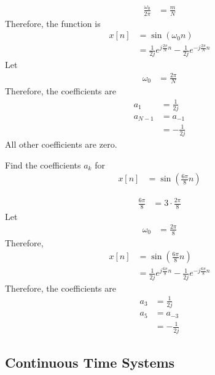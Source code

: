 \documentclass[titlepage, fleqn, a4paper, 12pt, twoside]{article}
\theoremstyle{definition}
\theoremstyle{theorem}
\begin{document}
\begin{solution}
	\begin{align*}
		\frac{\omega_0}{2 \pi} &= \frac{m}{N}
	\end{align*}
	Therefore, the function is
	\begin{align*}
		x[n] &= \sin(\omega_0 n)\\
		&= \frac{1}{2 j} e^{j \frac{2 \pi}{N} n} - \frac{1}{2 j} e^{-j \frac{2 \pi}{N} n}
	\end{align*}
	Let
	\begin{align*}
		\omega_0 &= \frac{2 \pi}{N}
	\end{align*}
	Therefore, the coefficients are
	\begin{align*}
		a_1 &= \frac{1}{2 j}\\
		a_{N - 1} &= a_{-1}\\
		&= -\frac{1}{2 j}
	\end{align*}
	All other coefficients are zero.
\end{solution}

\begin{question}
	Find the coefficients $a_k$ for
	\begin{align*}
		x[n] &= \sin\left( \frac{6 \pi}{8} n \right)
	\end{align*}
\end{question}

\begin{solution}
	\begin{align*}
		\frac{6 \pi}{8} &= 3 \cdot \frac{2 \pi}{8}
	\end{align*}
	Let
	\begin{align*}
		\omega_0 &= \frac{2 \pi}{8}
	\end{align*}
	Therefore,
	\begin{align*}
		x[n] &= \sin\left( \frac{6 \pi}{8} n \right)\\
		&= \frac{1}{2 j} e^{j \frac{6 \pi}{8} n} - \frac{1}{2 j} e^{-j \frac{6 \pi}{8} n}
	\end{align*}
	Therefore, the coefficients are
	\begin{align*}
		a_3 &= \frac{1}{2 j}\\
		a_5 &= a_{-3}\\
		&= -\frac{1}{2 j}
	\end{align*}
\end{solution}

\subsection{Continuous Time Systems}
\end{document}
